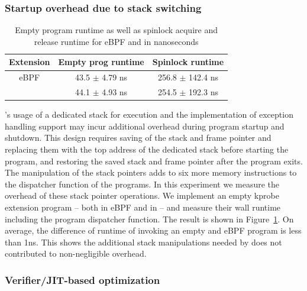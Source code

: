 \subsubsection{Startup overhead due to stack switching}
\begin{table}[t]
    \small
    \centering
    \begin{tabular}{ccc}%
        \toprule
        \textbf{Extension} & \textbf{Empty prog runtime} & \textbf{Spinlock runtime} \\
        \midrule
        eBPF & 43.5 $\pm$ 4.79 ns & 256.8 $\pm$ 142.4 ns\\
        \projname{} & 44.1 $\pm$ 4.93 ns & 254.5 $\pm$ 192.3 ns\\
        \bottomrule
    \end{tabular}
    \caption{Empty program runtime as well as spinlock acquire and release
        runtime for eBPF and \projname{} in nanoseconds}
    \vspace{-10pt}
    \label{tab:startup-cleanup}
\end{table}

\projname{}'s usage of a dedicated stack for execution and the implementation
    of exception handling support may incur additional overhead during program
    startup and shutdown.
This design requires saving of the stack and frame pointer and replacing them
    with the top address of the dedicated stack before starting the program,
    and restoring the saved stack and frame pointer after the program exits.
The manipulation of the stack pointers adds to six more memory instructions to
    the dispatcher function of the \projname{} programs.
In this experiment we measure the overhead of these stack pointer operations.
We implement an empty kprobe extension program -- both in eBPF and in
    \projname{} -- and measure their wall runtime including the program
    dispatcher function.
The result is shown in Figure~\ref{tab:startup-cleanup}.
On average, the difference of runtime of invoking an empty \projname{} and eBPF
    program is less than 1ns.
This shows the additional stack manipulations needed by \projname{} does not
    contributed to non-negligible overhead.

\subsubsection{Verifier/JIT-based optimization}
\label{eval:inline}

